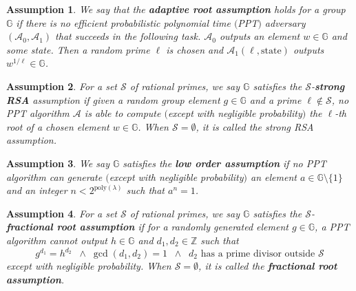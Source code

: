 \documentclass[11pt, lettersize, notitlepage, leqno, footskip=0.6cm]{article}
\newcommand{\bz}{\mathbb Z}
\newcommand{\bG}{\mathbb{G}}
\newcommand{\mc}{\mathcal}
\newcommand{\mb}{\mathbb}
\newcommand{\mr}{\mathrm}
\newcommand{\lam}{\lambda}
\newcommand{\vs}{\vspace{-0.15cm}}
\newtheorem{Ass}{Assumption}[section]
\numberwithin{equation}{section}
\begin{document}
\vspace{0.1cm}

\begin{Ass} We say that the \textbf{adaptive root assumption} holds for a group $\mb{G}$ if there is no efficient probabilistic polynomial time $($PPT$)$ adversary $(\mc{A}_0, \mc{A}_1)$ that succeeds in the following task. $\mc{A}_0$ outputs an element $w\in \mb{G}$ and some state. Then a random prime $\ell$ is chosen and $\mc{A}_1(\ell, \mr{state})$ outputs $w^{1/\ell}\in \mb{G}$. \end{Ass}
 

\begin{Ass} For a set $\mc{S}$ of rational primes, we say $\mb{G}$ satisfies the $\mc{S}$-\textbf{strong RSA} assumption if given a random group element $g\in\bG$ and a prime $\ell\notin \mc{S}$, no PPT algorithm $\mc{A}$ is able to compute $($except with negligible probability$)$ the $\ell$-th root of a chosen element $w\in \mb{G}$. When $\mc{S} = \emptyset$, it is called the {strong RSA} assumption.\end{Ass}

\begin{Ass} We say $\mb{G}$ satisfies the \textbf{low order assumption} if no PPT algorithm can generate $($except with negligible probability$)$ an element $a\in\mb{G}\setminus\{1\}$ and an integer $n< 2^{\mr{poly}(\lam)}$ such that $a^n = 1$.\end{Ass}


\begin{Ass} For a set $\mc{S}$ of rational primes, we say $\mb{G}$ satisfies the $\mc{S}$-\textbf{fractional root assumption} if for a randomly generated element $g\in \mb{G}$, a PPT algorithm cannot output $h\in\mb{G}$ and $d_1,d_2\in\bz$ such that \vs $$g^{d_1} = h^{d_2}\;\;\wedge\; \gcd(d_1,d_2) = 1\;\;\wedge\;\;d_2 \text{ has a prime divisor outside } \mc{S}$$ except with negligible probability. When $\mc{S} = \emptyset$, it is called the \textbf{fractional root assumption}. \end{Ass}
\end{document}
